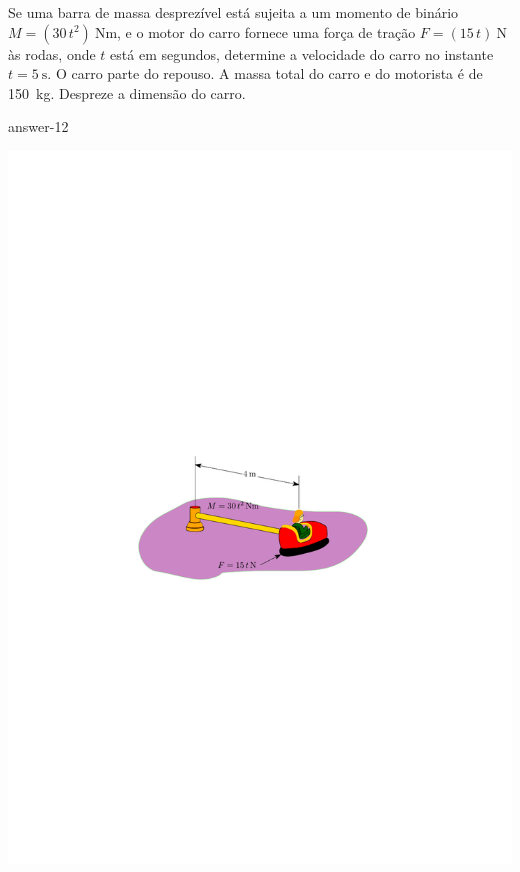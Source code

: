 \item Se uma barra de massa desprezível está sujeita a um momento de binário $M=(30\,t^{2})\SI{}{\newton\meter}$, e o motor do carro fornece uma força de tração $F=(15\,t)\SI{}{\newton}$ às rodas, onde $t$ está em segundos, determine a velocidade do carro no instante $t=\SI{5}{\second}$. O carro parte do repouso. A massa total do carro e do motorista é de \SI{150}{\kilogram}. Despreze a dimensão do carro.

{answer-12}

\vspace{-1.2cm}
\begin{flushright}
	\includegraphics[scale=1.2]{images/draw_12}
\end{flushright}